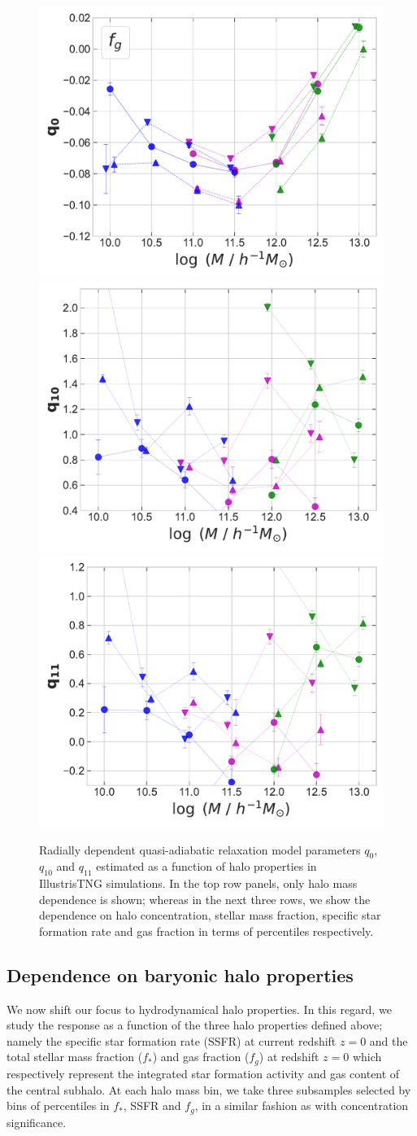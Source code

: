 \begin{figure}
    \includegraphics[width=0.32\linewidth]{plots/fit_param_q0_M-fg_T.pdf}
    \includegraphics[width=0.32\linewidth]{plots/fit_param_q10_M-fg_T.pdf}
    \includegraphics[width=0.32\linewidth]{plots/fit_param_q11_M-fg_T.pdf}
    \caption{Radially dependent quasi-adiabatic relaxation model parameters $q_{0}$, $q_{10}$ and $q_{11}$ estimated as a function of halo properties in IllustrisTNG simulations. In the top row panels, only halo mass dependence is shown; whereas in the next three rows, we show the dependence on halo concentration, stellar mass fraction, specific star formation rate and gas fraction in terms of percentiles respectively.} %
    \label{fig:fit-fit-func-q-ch:z0main}
\end{figure}


\subsection{Dependence on baryonic halo properties}
We now shift our focus to hydrodynamical halo properties. In this regard, we study the response as a function of the three halo properties defined above; namely the specific star formation rate (SSFR) at current redshift $z=0$ and the total stellar mass fraction ($f_{\ast}$) and gas fraction ($f_g$) at redshift $z=0$ which respectively represent the integrated star formation activity and gas content of the central subhalo. At each halo mass bin, we take three subsamples selected by bins of percentiles in $f_{\ast}$, SSFR and $f_g$, in a similar fashion as with concentration significance. %

